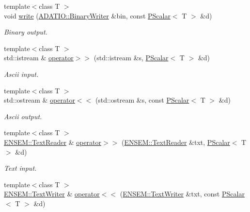 \begin{DoxyCompactItemize}
{\footnotesize template$<$class T $>$ }\\void \mbox{\hyperlink{group__primscalar_ga7db0b2a7539f81de4777d87b90de73c6}{write}} (\mbox{\hyperlink{classADATIO_1_1BinaryWriter}{A\+D\+A\+T\+I\+O\+::\+Binary\+Writer}} \&bin, const \mbox{\hyperlink{classENSEM_1_1PScalar}{P\+Scalar}}$<$ T $>$ \&d)
\begin{DoxyCompactList}\small\item\em Binary output. \end{DoxyCompactList}\item 
{\footnotesize template$<$class T $>$ }\\std\+::istream \& \mbox{\hyperlink{group__primscalar_gae4d02a7c5e314405b8a8efa45f1f7e62}{operator$>$$>$}} (std\+::istream \&s, \mbox{\hyperlink{classENSEM_1_1PScalar}{P\+Scalar}}$<$ T $>$ \&d)
\begin{DoxyCompactList}\small\item\em Ascii input. \end{DoxyCompactList}\item 
{\footnotesize template$<$class T $>$ }\\std\+::ostream \& \mbox{\hyperlink{group__primscalar_ga48eed9feafd51dc2ff5915922fc68275}{operator$<$$<$}} (std\+::ostream \&s, const \mbox{\hyperlink{classENSEM_1_1PScalar}{P\+Scalar}}$<$ T $>$ \&d)
\begin{DoxyCompactList}\small\item\em Ascii output. \end{DoxyCompactList}\item 
{\footnotesize template$<$class T $>$ }\\\mbox{\hyperlink{classENSEM_1_1TextReader}{E\+N\+S\+E\+M\+::\+Text\+Reader}} \& \mbox{\hyperlink{group__primscalar_gae6420bec950e94bc85d5f04a7eee20fe}{operator$>$$>$}} (\mbox{\hyperlink{classENSEM_1_1TextReader}{E\+N\+S\+E\+M\+::\+Text\+Reader}} \&txt, \mbox{\hyperlink{classENSEM_1_1PScalar}{P\+Scalar}}$<$ T $>$ \&d)
\begin{DoxyCompactList}\small\item\em Text input. \end{DoxyCompactList}\item 
{\footnotesize template$<$class T $>$ }\\\mbox{\hyperlink{classENSEM_1_1TextWriter}{E\+N\+S\+E\+M\+::\+Text\+Writer}} \& \mbox{\hyperlink{group__primscalar_gaa851ed6964c4ac3ce548dfb95692f221}{operator$<$$<$}} (\mbox{\hyperlink{classENSEM_1_1TextWriter}{E\+N\+S\+E\+M\+::\+Text\+Writer}} \&txt, const \mbox{\hyperlink{classENSEM_1_1PScalar}{P\+Scalar}}$<$ T $>$ \&d)

\end{DoxyCompactItemize}

